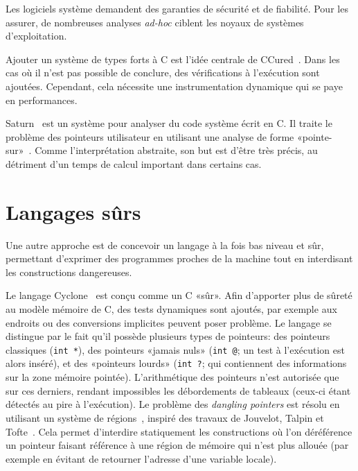 Les logiciels système demandent des garanties de sécurité et de fiabilité. Pour
les assurer, de nombreuses analyses \emph{ad-hoc} ciblent les noyaux de systèmes
d'exploitation.

Ajouter un système de types forts à C est l'idée centrale de
CCured~\cite{ccured-toplas}. Dans les cas où il n'est pas possible de conclure,
des vérifications à l'exécution sont ajoutées. Cependant, cela nécessite une
instrumentation dynamique qui se paye en performances.

Saturn~\cite{paste07} est un système pour analyser du code système écrit en C.
Il traite le problème des pointeurs utilisateur en utilisant une analyse de
forme «pointe-sur»~\cite{oakland08}. Comme l'interprétation abstraite, son but
est d'être très précis, au détriment d'un temps de calcul important dans
certains cas.


\section{Langages sûrs}

Une autre approche est de concevoir un langage à la fois bas niveau et sûr,
permettant d'exprimer des programmes proches de la machine tout en interdisant
les constructions dangereuses.

Le langage Cyclone~\cite{cyclone-safety} est conçu comme un C «sûr». Afin
d'apporter plus de sûreté au modèle mémoire de C, des tests dynamiques sont
ajoutés, par exemple aux endroits ou des conversions implicites peuvent poser
problème. Le langage se distingue par le fait qu'il possède plusieurs types de
pointeurs: des pointeurs classiques (\texttt{int *}), des pointeurs «jamais
nuls» (\texttt{int @}; un test à l'exécution est alors inséré), et des
«pointeurs lourds» (\verb!int ?!; qui contiennent des informations sur la zone
mémoire pointée). L'arithmétique des pointeurs n'est autorisée que sur ces
derniers, rendant impossibles les débordements de tableaux (ceux-ci étant
détectés au pire à l'exécution). Le problème des \emph{dangling pointers} est
résolu en utilisant un système de régions~\cite{cyclone-regions}, inspiré des
travaux de Jouvelot, Talpin et \linebreak Tofte~\cite{jfp92,ToTa1993,popl94}.
Cela permet d'interdire statiquement les constructions où l'on déréférence un
pointeur faisant référence à une région de mémoire qui n'est plus allouée (par
exemple en évitant de retourner l'adresse d'une variable locale).

